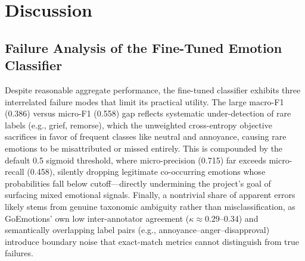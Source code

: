 \documentclass[graybox]{svmult}
\begin{document}
\section{Discussion}

\subsection{Failure Analysis of the Fine-Tuned Emotion Classifier}

Despite reasonable aggregate performance, the fine-tuned classifier exhibits three interrelated failure modes that limit its practical utility. The large macro-F1 (0.386) versus micro-F1 (0.558) gap reflects systematic under-detection of rare labels (e.g., grief, remorse), which the unweighted cross-entropy objective sacrifices in favor of frequent classes like neutral and annoyance, causing rare emotions to be misattributed or missed entirely. This is compounded by the default 0.5 sigmoid threshold, where micro-precision (0.715) far exceeds micro-recall (0.458), silently dropping legitimate co-occurring emotions whose probabilities fall below cutoff—directly undermining the project's goal of surfacing mixed emotional signals. Finally, a nontrivial share of apparent errors likely stems from genuine taxonomic ambiguity rather than misclassification, as GoEmotions' own low inter-annotator agreement ($\kappa \approx 0.29$--$0.34$) and semantically overlapping label pairs (e.g., annoyance--anger--disapproval) introduce boundary noise that exact-match metrics cannot distinguish from true failures. 
\end{document}
